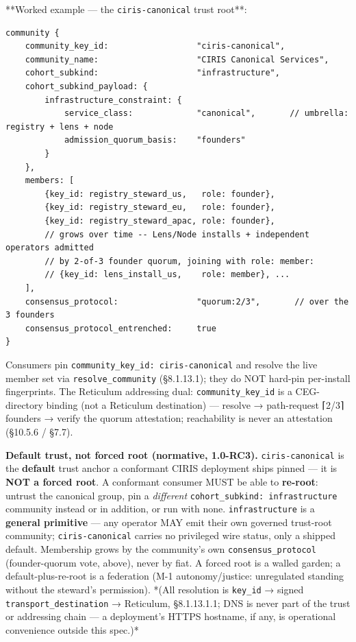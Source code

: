\documentclass[10pt]{article}
\begin{document}
**Worked example — the \texttt{ciris-canonical} trust root**:


\begin{lstlisting}
community {
    community_key_id:                  "ciris-canonical",
    community_name:                    "CIRIS Canonical Services",
    cohort_subkind:                    "infrastructure",
    cohort_subkind_payload: {
        infrastructure_constraint: {
            service_class:             "canonical",       // umbrella: registry + lens + node
            admission_quorum_basis:    "founders"
        }
    },
    members: [
        {key_id: registry_steward_us,   role: founder},
        {key_id: registry_steward_eu,   role: founder},
        {key_id: registry_steward_apac, role: founder},
        // grows over time -- Lens/Node installs + independent operators admitted
        // by 2-of-3 founder quorum, joining with role: member:
        // {key_id: lens_install_us,    role: member}, ...
    ],
    consensus_protocol:                "quorum:2/3",       // over the 3 founders
    consensus_protocol_entrenched:     true
}
\end{lstlisting}

Consumers pin \texttt{community\_key\_id: ciris-canonical} and resolve the live member set via \texttt{resolve\_community} (§8.1.13.1); they do NOT hard-pin per-install fingerprints. The Reticulum addressing dual: \texttt{community\_key\_id} is a CEG-directory binding (not a Reticulum destination) — resolve → path-request ⌈2/3⌉ founders → verify the quorum attestation; reachability is never an attestation (§10.5.6 / §7.7).


\textbf{Default trust, not forced root (normative, 1.0-RC3).} \texttt{ciris-canonical} is the \textbf{default} trust anchor a conformant CIRIS deployment ships pinned — it is \textbf{NOT a forced root}. A conformant consumer MUST be able to \textbf{re-root}: untrust the canonical group, pin a \textit{different} \texttt{cohort\_subkind: infrastructure} community instead or in addition, or run with none. \texttt{infrastructure} is a \textbf{general primitive} — any operator MAY emit their own governed trust-root community; \texttt{ciris-canonical} carries no privileged wire status, only a shipped default. Membership grows by the community's own \texttt{consensus\_protocol} (founder-quorum vote, above), never by fiat. A forced root is a walled garden; a default-plus-re-root is a federation (M-1 autonomy/justice: unregulated standing without the steward's permission). *(All resolution is \texttt{key\_id} → signed \texttt{transport\_destination} → Reticulum, §8.1.13.1.1; DNS is never part of the trust or addressing chain — a deployment's HTTPS hostname, if any, is operational convenience outside this spec.)*
\end{document}
